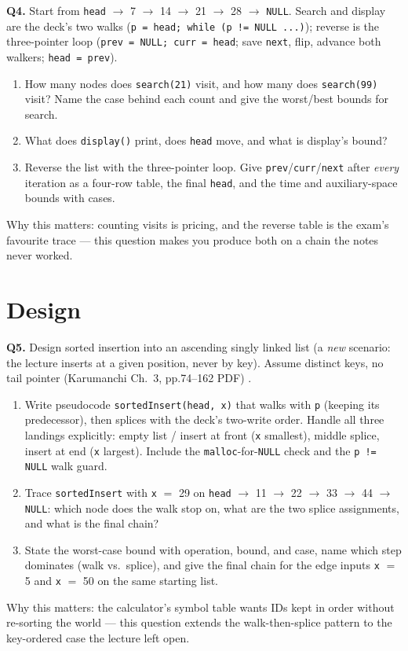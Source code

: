 \documentclass[11pt]{article}
\begin{document}
\textbf{Q4.} Start from \texttt{head} $\to$ 7 $\to$ 14 $\to$ 21 $\to$ 28 $\to$ \texttt{NULL}. Search and display are the deck's two walks (\texttt{p = head; while (p != NULL ...)}); reverse is the three-pointer loop (\texttt{prev = NULL; curr = head}; save \texttt{next}, flip, advance both walkers; \texttt{head = prev}).
\begin{enumerate}
  \item[(a)] How many nodes does \texttt{search(21)} visit, and how many does \texttt{search(99)} visit? Name the case behind each count and give the worst/best bounds for search.
  \item[(b)] What does \texttt{display()} print, does \texttt{head} move, and what is display's bound?
  \item[(c)] Reverse the list with the three-pointer loop. Give \texttt{prev}/\texttt{curr}/\texttt{next} after \emph{every} iteration as a four-row table, the final \texttt{head}, and the time and auxiliary-space bounds with cases.
\end{enumerate}
Why this matters: counting visits is pricing, and the reverse table is the exam's favourite trace --- this question makes you produce both on a chain the notes never worked.

\section{Design}

\textbf{Q5.} Design sorted insertion into an ascending singly linked list (a \emph{new} scenario: the lecture inserts at a given position, never by key). Assume distinct keys, no tail pointer (Karumanchi Ch.~3, pp.74--162 PDF) \cite{Karumanchi2017_data_structures_algorithms_made_easy}.
\begin{enumerate}
  \item[(a)] Write pseudocode \texttt{sortedInsert(head, x)} that walks with \texttt{p} (keeping its predecessor), then splices with the deck's two-write order. Handle all three landings explicitly: empty list / insert at front (\texttt{x} smallest), middle splice, insert at end (\texttt{x} largest). Include the \texttt{malloc}-for-\texttt{NULL} check and the \texttt{p != NULL} walk guard.
  \item[(b)] Trace \texttt{sortedInsert} with \texttt{x} $=$ 29 on \texttt{head} $\to$ 11 $\to$ 22 $\to$ 33 $\to$ 44 $\to$ \texttt{NULL}: which node does the walk stop on, what are the two splice assignments, and what is the final chain?
  \item[(c)] State the worst-case bound with operation, bound, and case, name which step dominates (walk vs.\ splice), and give the final chain for the edge inputs \texttt{x} $=$ 5 and \texttt{x} $=$ 50 on the same starting list.
\end{enumerate}
Why this matters: the calculator's symbol table wants IDs kept in order without re-sorting the world --- this question extends the walk-then-splice pattern to the key-ordered case the lecture left open.
\end{document}
